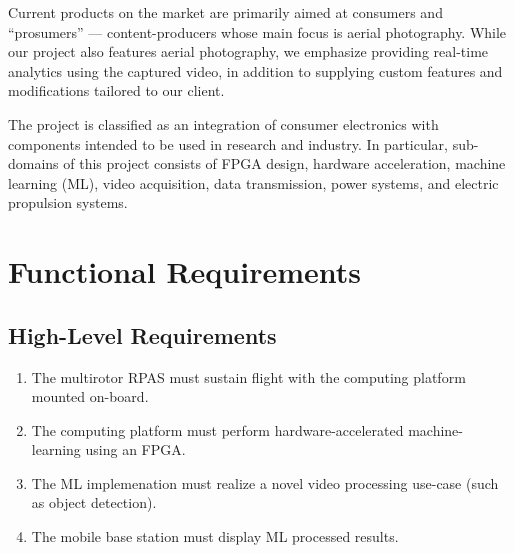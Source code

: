 \documentclass[10pt,letterpaper]{article}
\begin{document}
Current products on the market are primarily aimed at consumers and ``prosumers'' --- content-producers whose main focus is aerial photography. While our project also features aerial photography, we emphasize providing real-time analytics using the captured video, in addition to supplying custom features and modifications tailored to our client.

The project is classified as an integration of consumer electronics with components intended to be used in research and industry. In particular,  sub-domains of this project consists of FPGA design, hardware acceleration, machine learning (ML), video acquisition, data transmission, power systems, and electric propulsion systems. 

\newpage
\section{Functional Requirements}\label{section:funcreq} 

\subsection{High-Level Requirements}
\begin{enumerate}[label=F.HL.\arabic*, wide=1cm, widest=3cm, leftmargin=*, font=\bfseries, noitemsep,topsep=0pt, parsep=4pt, partopsep=0pt]
    \item The multirotor RPAS must sustain flight with the computing platform mounted on-board.
    \item The computing platform must perform hardware-accelerated machine-learning using an FPGA.
    \item The ML implemenation must realize a novel video processing use-case (such as object detection).
    \item The mobile base station must display ML processed results.
\end{enumerate}
\end{document}
